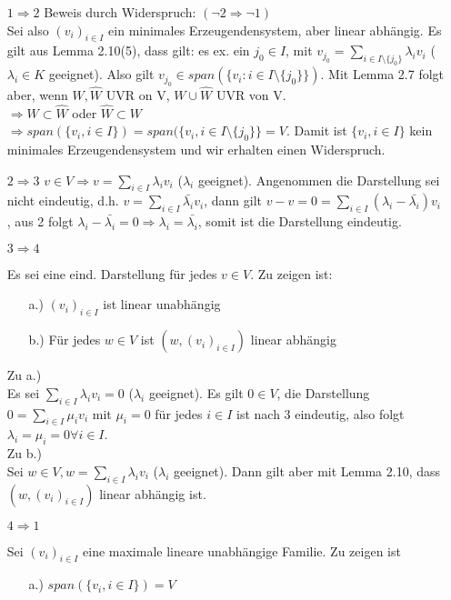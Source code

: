 \documentclass{scrartcl}
\newcommand{\lb}{\lambda}
\begin{document}
\begin{itemize}
\item[\(1 \Rightarrow 2\)]{Beweis durch Widerspruch: \((\neg 2 \Rightarrow \neg 1)\)\\
Sei also \((v_i)_{i \in I}\) ein minimales Erzeugendensystem, aber linear abh\"angig. Es gilt aus Lemma 2.10(5), dass gilt: es ex. ein \(j_0 \in I\), mit \(v_{j_0} = \sum_{i \in I \setminus \{j_0\}} \lb_i v_i\) (\(\lb_i \in K \) geeignet). Also gilt \(v_{j_0} \in span(\{v_i : i \in I \setminus \{j_0\}\})\). Mit Lemma 2.7 folgt aber, wenn \(W, \hat{W}\) UVR on V, \(W \cup \hat{W}\) UVR von V.\\
\(\Rightarrow W \subset \hat{W}\) oder \(\hat{W} \subset W\)\\
\(\Rightarrow span(\{v_i, i \in I\}) = span(\{v_i, i \in I \setminus \{j_0\}\} = V\). Damit ist \(\{v_i, i \in I\}\) kein minimales Erzeugendensystem und wir erhalten einen Widerspruch.
}
\item[\(2 \Rightarrow 3\)]{ \(v \in V \Rightarrow v = \sum_{i \in I}\lb_i v_i\) (\(\lb_i\) geeignet). Angenommen die Darstellung sei nicht eindeutig, d.h. \(v = \sum_{i \in I}\bar{\lb_i} v_i\), dann gilt \(v - v = 0 = \sum_{i \in I} (\lb_i - \bar{\lb_i}) v_i\), aus 2 folgt \(\lb_i - \bar{\lb_i} = 0 \Rightarrow \lb_i = \bar{\lb_i}\), somit ist die Darstellung eindeutig.
}
\item[\(3 \Rightarrow 4\)]{Es sei eine eind. Darstellung f\"ur jedes \(v \in V\). Zu zeigen ist:
\begin{enumerate}
\item[a.)]{\((v_i)_{i \in I}\) ist linear unabh\"angig}
\item[b.)]{F\"ur jedes \(w \in V\) ist \((w, (v_i)_{i \in I})\) linear abh\"angig}
\end{enumerate}
Zu a.)\\
Es sei \(\sum_{i \in I}\lb_i v_i = 0\) (\(\lb_i\) geeignet). Es gilt \(0 \in V\), die Darstellung \(0 = \sum_{i \in I}\mu_i v_i\) mit \(\mu_i = 0\) f\"ur jedes \(i \in I\) ist nach 3 eindeutig, also folgt \(\lb_i = \mu_i = 0 \forall i \in I\).\\
Zu b.)\\
Sei \(w \in V, w = \sum_{i \in I} \lb_i v_i\) (\(\lb_i\) geeignet). Dann gilt aber mit Lemma 2.10, dass \((w, (v_i)_{i \in I})\) linear abh\"angig ist.
}
\item[\(4 \Rightarrow 1\)]{
Sei \((v_i)_{i \in I}\) eine maximale lineare unabh\"angige Familie. Zu zeigen ist
\begin{itemize}
\item[a.)]{\(span(\{v_i, i \in I\}) = V\)}

\end{itemize}}
\end{itemize}
\end{document}
